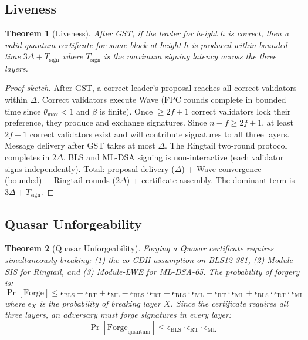 \documentclass[11pt,a4paper]{article}
\newtheorem{theorem}{Theorem}[section]
\begin{document}
\subsection{Liveness}

\begin{theorem}[Liveness]
\label{thm:liveness}
After GST, if the leader for height $h$ is correct, then a valid quantum
certificate for some block at height $h$ is produced within bounded time
$3\Delta + T_{\mathrm{sign}}$ where $T_{\mathrm{sign}}$ is the maximum
signing latency across the three layers.
\end{theorem}

\begin{proof}[Proof sketch]
After GST, a correct leader's proposal reaches all correct validators within
$\Delta$. Correct validators execute Wave (FPC rounds complete in bounded time
since $\theta_{\max} < 1$ and $\beta$ is finite). Once $\geq 2f+1$ correct
validators lock their preference, they produce and exchange signatures. Since
$n - f \geq 2f+1$, at least $2f+1$ correct validators exist and will
contribute signatures to all three layers. Message delivery after GST takes at
most $\Delta$. The Ringtail two-round protocol completes in $2\Delta$.
BLS and ML-DSA signing is non-interactive (each validator signs independently).
Total: proposal delivery ($\Delta$) + Wave convergence (bounded) + Ringtail
rounds ($2\Delta$) + certificate assembly. The dominant term is $3\Delta +
T_{\mathrm{sign}}$.
\end{proof}

\subsection{Quasar Unforgeability}

\begin{theorem}[Quasar Unforgeability]
\label{thm:unforgeability}
Forging a Quasar certificate requires simultaneously breaking: (1) the
co-CDH assumption on BLS12-381, (2) Module-SIS for Ringtail, and (3)
Module-LWE for ML-DSA-65. The probability of forgery is:
\[
\Pr[\mathrm{Forge}] \leq \epsilon_{\mathrm{BLS}} +
\epsilon_{\mathrm{RT}} + \epsilon_{\mathrm{ML}} -
\epsilon_{\mathrm{BLS}} \cdot \epsilon_{\mathrm{RT}} -
\epsilon_{\mathrm{BLS}} \cdot \epsilon_{\mathrm{ML}} -
\epsilon_{\mathrm{RT}} \cdot \epsilon_{\mathrm{ML}} +
\epsilon_{\mathrm{BLS}} \cdot \epsilon_{\mathrm{RT}} \cdot
\epsilon_{\mathrm{ML}}
\]
where $\epsilon_X$ is the probability of breaking layer $X$. Since the
certificate requires all three layers, an adversary must forge signatures
in every layer:
\[
\Pr[\mathrm{Forge}_{\mathrm{quantum}}] \leq
\epsilon_{\mathrm{BLS}} \cdot \epsilon_{\mathrm{RT}} \cdot
\epsilon_{\mathrm{ML}}
\]
\end{theorem}
\end{document}
